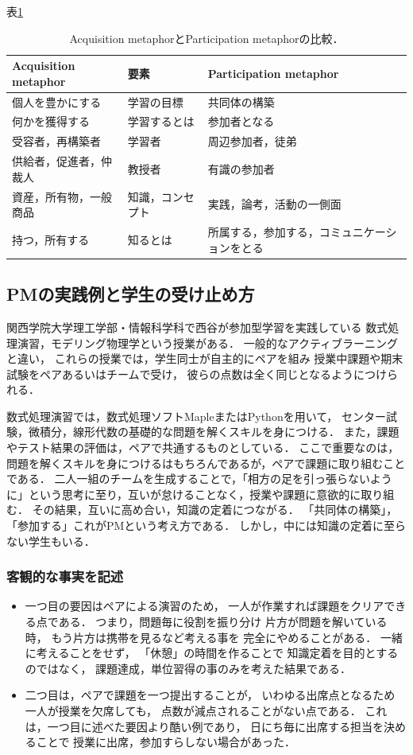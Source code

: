 \documentclass{hissymp}
\begin{document}
表\ref{tab:org00bb5a5}

\begin{table}[bt]
\caption{\label{tab:org00bb5a5}
Acquisition metaphorとParticipation metaphorの比較．}
\centering
\begin{tabular}{lll}
\hline
Acquisition metaphor & 要素 & Participation metaphor\\
\hline
個人を豊かにする & 学習の目標 & 共同体の構築\\
何かを獲得する & 学習するとは & 参加者となる\\
受容者，再構築者 & 学習者 & 周辺参加者，徒弟\\
供給者，促進者，仲裁人 & 教授者 & 有識の参加者\\
資産，所有物，一般商品 & 知識，コンセプト & 実践，論考，活動の一側面\\
持つ，所有する & 知るとは & 所属する，参加する，コミュニケーションをとる\\
\hline
\end{tabular}
\end{table}

\subsection{PMの実践例と学生の受け止め方}
\label{sec:org7caf9df}
関西学院大学理工学部・情報科学科で西谷が参加型学習を実践している
数式処理演習，モデリング物理学という授業がある．
一般的なアクティブラーニングと違い，
これらの授業では，学生同士が自主的にペアを組み
授業中課題や期末試験をペアあるいはチームで受け，
彼らの点数は全く同じとなるようにつけられる．

数式処理演習では，数式処理ソフトMapleまたはPythonを用いて，
センター試験，微積分，線形代数の基礎的な問題を解くスキルを身につける．
また，課題やテスト結果の評価は，ペアで共通するものとしている．
ここで重要なのは，問題を解くスキルを身につけるはもちろんであるが，ペアで課題に取り組むことである．
二人一組のチームを生成することで，「相方の足を引っ張らないように」という思考に至り，互いが怠けることなく，授業や課題に意欲的に取り組む．
その結果，互いに高め合い，知識の定着につながる．
「共同体の構築」，「参加する」これがPMという考え方である．
しかし，中には知識の定着に至らない学生もいる．
\subsubsection{客観的な事実を記述}
\label{sec:org3c29a79}
\begin{itemize}
\item 一つ目の要因はペアによる演習のため，
一人が作業すれば課題をクリアできる点である．
つまり，問題毎に役割を振り分け 
片方が問題を解いている時，
もう片方は携帯を見るなど考える事を
完全にやめることがある．
一緒に考えることをせず，
「休憩」の時間を作ることで
知識定着を目的とするのではなく，
課題達成，単位習得の事のみを考えた結果である．

\item 二つ目は，ペアで課題を一つ提出することが，
いわゆる出席点となるため
一人が授業を欠席しても，
点数が減点されることがない点である．
これは，一つ目に述べた要因より酷い例であり，
日にち毎に出席する担当を決めることで
授業に出席，参加すらしない場合があった．
\end{itemize}
\end{document}
